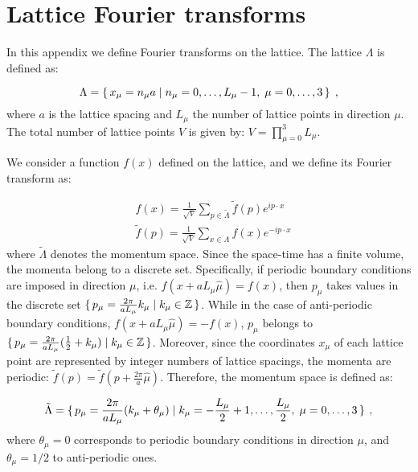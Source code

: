 \section{Lattice Fourier transforms}
\label{Fourier}

In this appendix we define Fourier transforms on the lattice. The lattice $\Lambda$ is defined as: 

\begin{equation}
\Lambda = \set{x_{\mu} = n_{\mu} a  \mid  n_{\mu}  = 0, \dots, L_{\mu} -1, \; \mu = 0, \dots, 3 } \; ,
\end{equation}
%
where $a$ is the lattice spacing and $L_{ \mu}$ the number of lattice points in direction $\mu$. The total number of lattice points $V$ is given by: $V = \prod_{\mu=0}^3 L_{\mu}$.

We consider a function $f(x)$ defined on the lattice, and we define its Fourier transform as:

\begin{equation}
\begin{split}
&f(x) = \frac{1}{\sqrt V} \sum_{p \in \tilde\Lambda} \tilde f(p) e^{i p \cdot x}\\
&\tilde f(p) = \frac{1}{\sqrt V} \sum_{x \in \Lambda}  f(x) e^{-i p \cdot x}
\end{split}
\end{equation}
%
where $\tilde\Lambda$ denotes the momentum space. Since the space-time has a finite volume, the momenta belong to a discrete set. Specifically, if periodic boundary conditions are imposed in direction $\mu$, i.e. $f(x+aL_{\mu} \hat\mu) = f(x)$, then $p_{\mu}$ takes values in the discrete set $\set{p_{\mu} = \frac{2\pi}{a L_{\mu}} k_{\mu} \mid k_{\mu} \in \mathbb{Z}}$. While in the case of anti-periodic boundary conditions, $f(x+aL_{\mu} \hat\mu) = -f(x)$, $p_{\mu}$ belongs to $\set{p_{\mu} = \frac{2\pi}{a L_{\mu}} (\frac{1}{2} + k_{\mu}) \mid k_{\mu} \in \mathbb{Z}}$. Moreover, since the coordinates $x_{\mu}$ of each lattice point are represented by integer numbers of lattice spacings, the momenta are periodic: $\tilde f(p) = \tilde f(p + \frac{2\pi}{a}\hat\mu)$. Therefore, the momentum space is defined as:

\begin{equation}
\tilde\Lambda = \set{p_{\mu} = \frac{2 \pi}{a L_{\mu}}(k_{\mu} + \theta_{\mu})  \mid  k_{\mu} = -\frac{L_{\mu}}{2} + 1, \dots, \frac{L_{\mu}}{2}, \; \mu = 0, \dots, 3 } \: ,
\end{equation}
%
where $\theta_{\mu} = 0$ corresponds to periodic boundary conditions in direction $\mu$, and $\theta_{\mu} = 1/2$ to anti-periodic ones.

